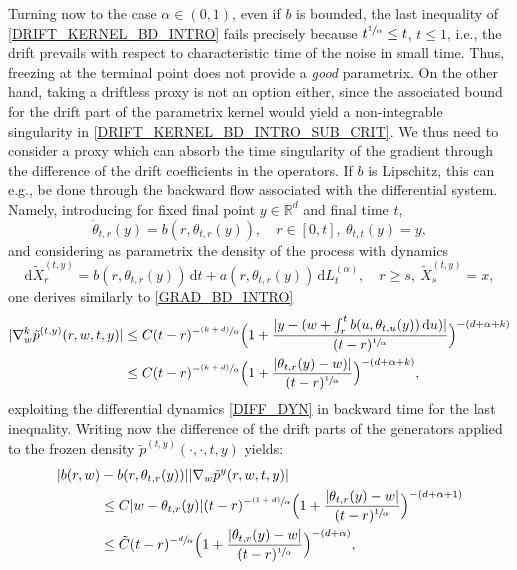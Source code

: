 \documentclass[11pt]{article}
\newcommand{\ie}{i.e.,\xspace}
\newcommand{\eg}{e.g.,\xspace}
\numberwithin{equation}{section}\providecommand{\asymp}{\mathrel{\sim}}
\newcommand{\psfrac}[2]{\sfrac{(#1)}{#2}}
\newcommand{\rd}{\mathrm{d}}
\theoremstyle{plain}
\theoremstyle{definition}
\newcommand\mR{\mathbb{R}}
\newcommand\1{{\mathbf{1}}}
\newcommand{\dif}{\,\mathrm{d}}
\begin{document}
{Turning now to the case $\alpha\in (0,1) $, even if $b$ is bounded, the last inequality of \eqref{DRIFT_KERNEL_BD_INTRO} fails precisely because $t^{\sfrac 1\alpha} \le t$, $t\le 1 $, \ie the drift prevails with respect to characteristic time of the noise in small time. Thus, freezing at the terminal point does not provide a \textit{good} parametrix. On the other hand, taking a driftless proxy is not an option either, since the associated bound for the drift part of the parametrix kernel would yield a non-integrable singularity in \eqref{DRIFT_KERNEL_BD_INTRO_SUB_CRIT}. We thus need to consider a proxy which can absorb the time singularity of the gradient through the difference of the drift coefficients in the operators. If $b$ is Lipschitz, this can \eg be done through the backward flow associated with the differential system. Namely,
introducing for fixed final point $y\in \mR^d$ and final time $t$,
\begin{equation}\label{DIFF_DYN}
\dot \theta_{t,r}(y)=b(r,\theta_{t,r}(y)),\quad r\in [0,t],\ \theta_{t,t}(y)=y,
\end{equation}
and considering as parametrix the density of the process with dynamics
\begin{equation}\label{PROXY_2}
\rd \tilde X_r^{(t,y)}=b(r,\theta_{t,r}(y))\dif t+a(r,\theta_{t,r}(y))\dif L^{(\alpha)}_t,\quad r\ge s,\ \tilde X_s^{(t,y)}=x,
\end{equation}
one derives similarly to \eqref{GRAD_BD_INTRO}
\begin{align*}%
|\nabla_w^k \tilde p^{(t,y)}(r,w,t,y)|&\le C (t-r)^{-\psfrac{k+d}\alpha}\Bigl(1+\frac{|y-(w+\int_r^t b(u,\theta_{t,u}(y))\dif u)|}{(t-r)^{\sfrac 1\alpha}}\Bigr)^{-(d+\alpha+k)}\\
&\le  C (t-r)^{-\psfrac{k+d}\alpha}\Bigl(1+\frac{|\theta_{t,r}(y)-w)|}{(t-r)^{\sfrac 1\alpha}}\Bigr)^{-(d+\alpha+k)},
\end{align*}
exploiting the differential dynamics \eqref{DIFF_DYN} in backward time for the last inequality.
Writing now the difference of the drift parts of the generators applied to the frozen density $\tilde p^{(t,y)}(\cdot,\cdot,t,y)$ yields:
\begin{align*}
|b(r,w)&-b(r,\theta_{t,r}(y))||\nabla_w \tilde p^y(r,w,t,y)|\\
&\le  C |w-\theta_{t,r}(y)|(t-r)^{-\psfrac{1+d}\alpha}\Bigl(1+\frac{|\theta_{t,r}(y)-w|}{(t-r)^{\sfrac 1\alpha}}\Bigr)^{-(d+\alpha+1)}\\
&\le  \tilde C (t-r)^{-\sfrac{d}\alpha}\Bigl(1+\frac{|\theta_{t,r}(y)-w|}{(t-r)^{\sfrac 1\alpha}}\Bigr)^{-(d+\alpha)},

\end{align*}}
\end{document}
